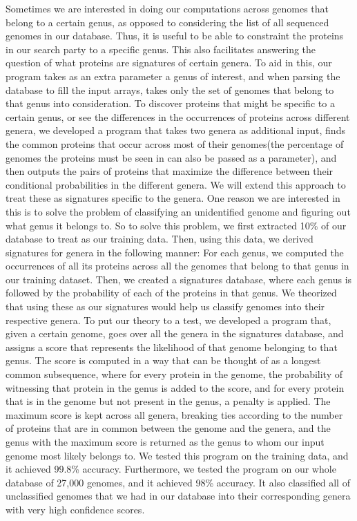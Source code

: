 \documentclass{ucetd}
\begin{document}
Sometimes we are interested in doing our computations across genomes that belong to a certain genus, as opposed to considering the list of all sequenced genomes in our database. Thus, it is useful to be able to constraint the proteins in our search party to a specific genus. This also facilitates answering the question of what proteins are signatures of certain genera. To aid in this, our program takes as an extra parameter a genus of interest, and when parsing the database to fill the input arrays, takes only the set of genomes that belong to that genus into consideration.
To discover proteins that might be specific to a certain genus, or see the differences in the occurrences of proteins across different genera, we developed a program that takes two genera as additional input, finds the common proteins that occur across most of their genomes(the percentage of genomes the proteins must be seen in can also be passed as a parameter), and then outputs the pairs of proteins that maximize the difference between their conditional probabilities in the different genera. We will extend this approach to treat these as signatures specific to the genera. 
One reason we are interested in this is to solve the problem of classifying an unidentified genome and figuring out what genus it belongs to. So to solve this problem, we first extracted 10\% of our database to treat as our training data. Then, using this data, we derived signatures for genera in the following manner: 
For each genus, we computed the occurrences of all its proteins across all the genomes that belong to that genus in our training dataset. Then, we created a signatures database, where each genus is followed by the probability of each of the proteins in that genus. 
We theorized that using these as our signatures would help us classify genomes into their respective genera. To put our theory to a test, we developed a program that, given a certain genome, goes over all the genera in the signatures database, and assigns a score that represents the likelihood of that genome belonging to that genus. The score is computed in a way that can be thought of as a longest common subsequence, where for every protein in the genome, the probability of witnessing that protein in the genus is added to the score, and for every protein that is in the genome but not present in the genus, a penalty is applied. The maximum score is kept across all genera, breaking ties according to the number of proteins that are in common between the genome and the genera, and the genus with the maximum score is returned as the genus to whom our input genome most likely belongs to. We tested this program on the training data, and it achieved 99.8\% accuracy. Furthermore, we tested the program on our whole database of 27,000 genomes, and it achieved 98\% accuracy. It also classified all of unclassified genomes that we had in our database into their corresponding genera with very high confidence scores. 
\end{document}
